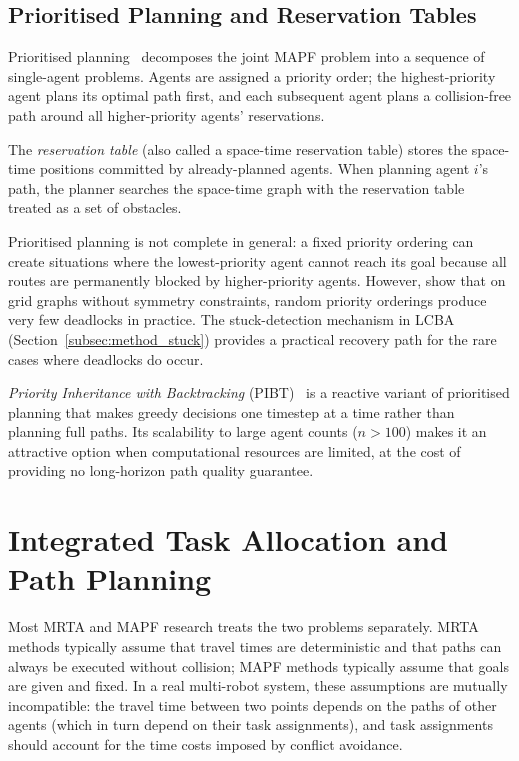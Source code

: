\subsection{Prioritised Planning and Reservation Tables}
\label{subsec:bg_prioritised}

Prioritised planning~\cite{silver2005cooperative} decomposes the joint MAPF
problem into a sequence of single-agent problems.
Agents are assigned a priority order; the highest-priority agent plans its
optimal path first, and each subsequent agent plans a collision-free path
around all higher-priority agents' reservations.

The \emph{reservation table} (also called a space-time reservation table)
stores the space-time positions committed by already-planned agents.
When planning agent $i$'s path, the planner searches the space-time graph
with the reservation table treated as a set of obstacles.

Prioritised planning is not complete in general: a fixed priority ordering can
create situations where the lowest-priority agent cannot reach its goal because
all routes are permanently blocked by higher-priority agents.
However, \citet{silver2005cooperative} show that on grid graphs without
symmetry constraints, random priority orderings produce very few deadlocks in
practice.
The stuck-detection mechanism in LCBA (Section~\ref{subsec:method_stuck})
provides a practical recovery path for the rare cases where deadlocks do occur.

\emph{Priority Inheritance with Backtracking} (PIBT)~\cite{okumura2019pibt}
is a reactive variant of prioritised planning that makes greedy decisions
one timestep at a time rather than planning full paths.
Its scalability to large agent counts ($n > 100$) makes it an attractive option
when computational resources are limited, at the cost of providing no
long-horizon path quality guarantee.


\section{Integrated Task Allocation and Path Planning}
\label{sec:bg_integrated}

Most MRTA and MAPF research treats the two problems separately.
MRTA methods typically assume that travel times are deterministic and that
paths can always be executed without collision; MAPF methods typically assume
that goals are given and fixed.
In a real multi-robot system, these assumptions are mutually incompatible:
the travel time between two points depends on the paths of other agents (which
in turn depend on their task assignments), and task assignments should account
for the time costs imposed by conflict avoidance.

